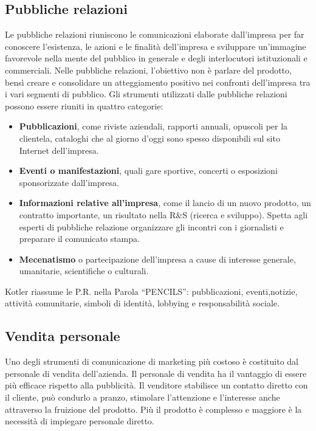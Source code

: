 \subsection{Pubbliche relazioni}
Le pubbliche relazioni riuniscono le comunicazioni
elaborate dall'impresa per far conoscere l’esistenza, le azioni e le finalità dell'impresa e sviluppare
un’immagine favorevole nella mente del pubblico in
generale e degli interlocutori istituzionali e commerciali. Nelle pubbliche relazioni, l’obiettivo non è parlare del prodotto, bensì creare e consolidare un atteggiamento positivo nei confronti dell'impresa tra i vari segmenti di pubblico. \newline
Gli strumenti utilizzati dalle pubbliche relazioni possono essere riuniti in quattro categorie:
\begin{itemize}
	\item \textbf{Pubblicazioni}, come riviste aziendali, rapporti annuali, opuscoli per la clientela, cataloghi che al giorno d’oggi sono spesso disponibili sul sito Internet dell'impresa.
	\item \textbf{Eventi o manifestazioni}, quali gare sportive, concerti o	esposizioni sponsorizzate dall’impresa.
	\item \textbf{Informazioni relative all’impresa}, come il lancio di un nuovo prodotto, un contratto importante, un risultato nella R\&S (ricerca e sviluppo). Spetta agli
	esperti di pubbliche relazione organizzare gli incontri con i giornalisti e preparare il comunicato stampa.
	\item \textbf{Mecenatismo} o partecipazione dell'impresa a cause di interesse generale, umanitarie, scientifiche o culturali.
\end{itemize}
Kotler riassume le P.R. nella Parola “PENCILS”: pubblicazioni, eventi,notizie, attività comunitarie, simboli di identità, lobbying e responsabilità sociale.

\subsection{Vendita personale}
Uno degli strumenti di comunicazione di marketing più costoso è costituito dal personale di vendita dell'azienda.
Il personale di vendita ha il vantaggio di essere più efficace rispetto alla pubblicità. Il venditore stabilisce un contatto diretto con il cliente, può condurlo a pranzo, stimolare l’attenzione e l’interesse anche attraverso la fruizione del prodotto. Più il prodotto è complesso e maggiore è la necessità di impiegare personale diretto.

